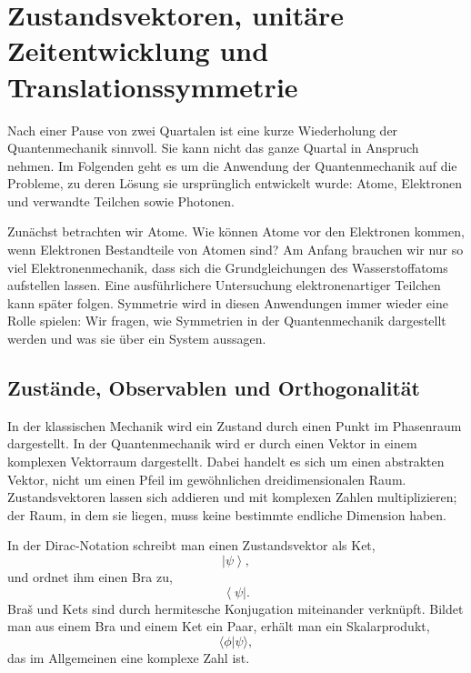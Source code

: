 \chapter{Zustandsvektoren, unitäre Zeitentwicklung und Translationssymmetrie}
\providecommand{\ket}[1]{\left\lvert#1\right\rangle}
\providecommand{\bra}[1]{\left\langle#1\right\rvert}

Nach einer Pause von zwei Quartalen ist eine kurze Wiederholung der Quantenmechanik sinnvoll. Sie kann nicht das ganze Quartal in Anspruch nehmen. Im Folgenden geht es um die Anwendung der Quantenmechanik auf die Probleme, zu deren Lösung sie ursprünglich entwickelt wurde: Atome, Elektronen und verwandte Teilchen sowie Photonen.

Zunächst betrachten wir Atome. Wie können Atome vor den Elektronen kommen, wenn Elektronen Bestandteile von Atomen sind? Am Anfang brauchen wir nur so viel Elektronenmechanik, dass sich die Grundgleichungen des Wasserstoffatoms aufstellen lassen. Eine ausführlichere Untersuchung elektronenartiger Teilchen kann später folgen. Symmetrie wird in diesen Anwendungen immer wieder eine Rolle spielen: Wir fragen, wie Symmetrien in der Quantenmechanik dargestellt werden und was sie über ein System aussagen.

\section{Zustände, Observablen und Orthogonalität}

In der klassischen Mechanik wird ein Zustand durch einen Punkt im Phasenraum dargestellt. In der Quantenmechanik wird er durch einen Vektor in einem komplexen Vektorraum dargestellt. Dabei handelt es sich um einen abstrakten Vektor, nicht um einen Pfeil im gewöhnlichen dreidimensionalen Raum. Zustandsvektoren lassen sich addieren und mit komplexen Zahlen multiplizieren; der Raum, in dem sie liegen, muss keine bestimmte endliche Dimension haben.

In der Dirac-Notation schreibt man einen Zustandsvektor als Ket,
\begin{equation}
\ket{\psi},
\end{equation}
und ordnet ihm einen Bra zu,
\begin{equation}
\bra{\psi}.
\end{equation}
Braš und Kets sind durch hermitesche Konjugation miteinander verknüpft. Bildet man aus einem Bra und einem Ket ein Paar, erhält man ein Skalarprodukt,
\begin{equation}
\langle\phi|\psi\rangle,
\end{equation}
das im Allgemeinen eine komplexe Zahl ist.

